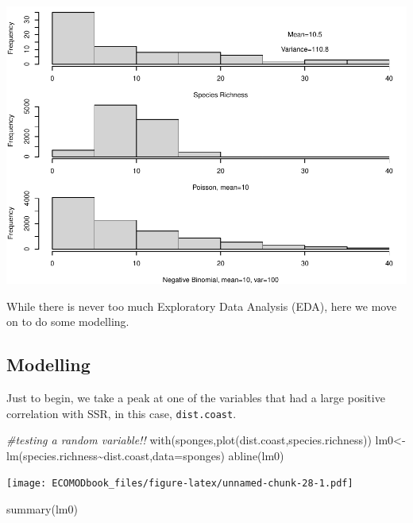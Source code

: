 \documentclass[
]{book}
\newenvironment{Shaded}{\begin{snugshade}}{\end{snugshade}}
\newcommand{\AttributeTok}[1]{\textcolor[rgb]{0.77,0.63,0.00}{#1}}
\newcommand{\CommentTok}[1]{\textcolor[rgb]{0.56,0.35,0.01}{\textit{#1}}}
\newcommand{\FunctionTok}[1]{\textcolor[rgb]{0.00,0.00,0.00}{#1}}
\newcommand{\NormalTok}[1]{#1}
\newcommand{\OtherTok}[1]{\textcolor[rgb]{0.56,0.35,0.01}{#1}}
\newcommand{\SpecialCharTok}[1]{\textcolor[rgb]{0.00,0.00,0.00}{#1}}
\begin{document}
\includegraphics{ECOMODbook_files/figure-latex/unnamed-chunk-27-1.pdf}

While there is never too much Exploratory Data Analysis (EDA), here we move on to do some modelling.

\hypertarget{modelling}{%
\subsection{Modelling}\label{modelling}}

Just to begin, we take a peak at one of the variables that had a large positive correlation with SSR, in this case, \texttt{dist.coast}.

\begin{Shaded}
\begin{Highlighting}[]
\CommentTok{\#testing a random variable!!}
\FunctionTok{with}\NormalTok{(sponges,}\FunctionTok{plot}\NormalTok{(dist.coast,species.richness))}
\NormalTok{lm0}\OtherTok{\textless{}{-}}\FunctionTok{lm}\NormalTok{(species.richness}\SpecialCharTok{\textasciitilde{}}\NormalTok{dist.coast,}\AttributeTok{data=}\NormalTok{sponges)}
\FunctionTok{abline}\NormalTok{(lm0)}
\end{Highlighting}
\end{Shaded}

\texttt{[image: ECOMODbook\_files/figure-latex/unnamed-chunk-28-1.pdf]}

\begin{Shaded}
\begin{Highlighting}[]
\FunctionTok{summary}\NormalTok{(lm0)}
\end{Highlighting}
\end{Shaded}
\end{document}
